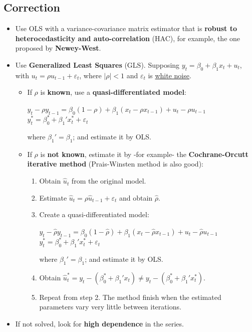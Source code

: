\documentclass[10pt, a4paper, landscape]{extarticle}
\begin{document}
\begin{multicols}{3}
	\subsection*{Correction}
		\begin{itemize}[leftmargin=*]
			\item Use OLS with a variance-covariance matrix estimator that is \textbf{robust to heterocedasticity and auto-correlation} (HAC), for example, the one proposed by \textbf{Newey-West}.
			\item Use \textbf{Generalized Least Squares} (GLS). Supposing $y_t = \beta_0 + \beta_1 x_t + u_t$, with $u_t = \rho u_{t-1} + \varepsilon_t$, where $|\rho| < 1$ and $\varepsilon_t$ is \underline{white noise}.
			\begin{itemize}[leftmargin=*]
				\item If $\rho$ is \textbf{known}, use a \textbf{quasi-differentiated model}:
				\begin{center}
					$y_t - \rho y_{t-1} = \beta_0 (1 - \rho) + \beta_1 (x_t - \rho x_{t-1}) + u_t - \rho u_{t-1}$
					\ $y_t^* = \beta_0^* + \beta_1' x_t^* + \varepsilon_t$
				\end{center}
				where $\beta_1' = \beta_1$; and estimate it by OLS.
				\item If $\rho$ is \textbf{not known}, estimate it by -for example- the \textbf{Cochrane-Orcutt iterative method} (Prais-Winsten method is also good):
				\begin{enumerate}[leftmargin=*]
					\item Obtain $\hat{u}_t$ from the original model.
					\item Estimate $\hat{u}_t = \rho \hat{u}_{t-1} + \varepsilon_t$ and obtain $\hat{\rho}$.
					\item Create a quasi-differentiated model:
					\begin{center}
						$y_t - \hat{\rho} y_{t-1} = \beta_0 (1 - \hat{\rho}) + \beta_1 (x_t - \hat{\rho} x_{t-1}) + u_t - \hat{\rho} u_{t-1}$
						\ $y_t^* = \beta_0^* + \beta_1' x_t^* + \varepsilon_t$
					\end{center}
					where $\beta_1' = \beta_1$; and estimate it by OLS.
					\item Obtain $\hat{u}_t^* = y_t - (\beta_0^* + \beta_1' x_t) \neq y_t - (\beta_0^* + \beta_1' x_t^*)$.
					\item Repeat from step 2. The method finish when the estimated parameters vary very little between iterations.
				\end{enumerate}
			\end{itemize}
		\item If not solved, look for \textbf{high dependence} in the series.
		\end{itemize}


\end{multicols}
\end{document}
